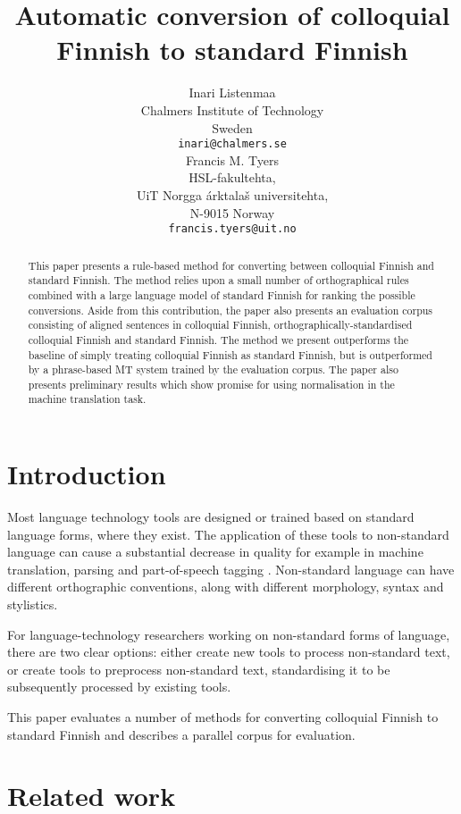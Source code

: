 \documentclass[11pt]{article}
\title{Automatic conversion of colloquial Finnish to standard Finnish}
\author{ Inari Listenmaa\\
  Chalmers Institute of Technology \\
  Sweden \\
  {\tt inari@chalmers.se} \\\And
 Francis M. Tyers\\
  HSL-fakultehta, \\
  UiT Norgga \'{a}rktala\v{s} universitehta, \\
  N-9015 Norway \\
  {\tt francis.tyers@uit.no} }
\date{}
\begin{document}
\maketitle
\begin{abstract}
  This paper presents a rule-based method for converting between colloquial Finnish
  and standard Finnish. The method relies upon a small number of orthographical rules
  combined with a large language model of standard Finnish for ranking the possible 
  conversions. Aside from this contribution, the paper also presents an evaluation
  corpus consisting of aligned sentences in colloquial Finnish, orthographically-standardised
  colloquial Finnish and standard Finnish. The method we present outperforms the baseline
  of simply treating colloquial Finnish as standard Finnish, but is outperformed by a phrase-based 
 MT system trained by the evaluation corpus.
  The paper also presents preliminary results which show promise for using normalisation in 
  the machine translation task.
\end{abstract}

\section{Introduction}

Most language technology tools are designed or trained based on standard language 
forms, where they exist. The application of these tools to non-standard
language can cause a substantial decrease in quality for example in machine translation,
parsing and part-of-speech tagging \cite{eisenstein2013}. Non-standard language can 
have different orthographic conventions, along with different morphology, syntax and stylistics.

For language-technology researchers working on non-standard forms of language, there are 
two clear options: either create new tools to process non-standard text,
  or create tools to preprocess non-standard text, standardising it to be subsequently processed
 by existing tools.

This paper evaluates a number of methods for converting colloquial Finnish to 
standard Finnish and describes a parallel corpus for evaluation.

\section{Related work}
\end{document}
